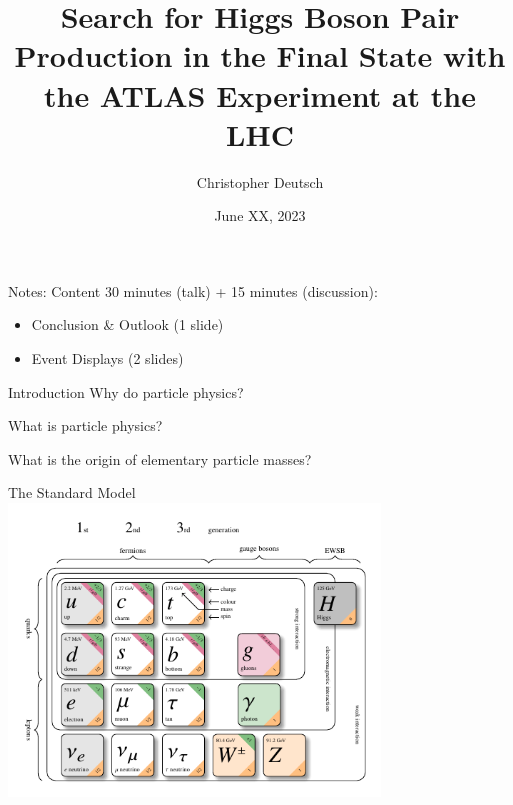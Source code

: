 \documentclass[11pt, xcolor={dvipsnames}, aspectratio=169]{beamer}
\author{Christopher Deutsch}
\institute{University of Bonn}
\date{June XX, 2023}
\title{\vspace{1em}Search for Higgs Boson Pair Production in the \bbtautau Final
  State with the ATLAS Experiment at the LHC}
\begin{document}
\maketitle

\begin{frame}[noframenumbering]{Notes: Content}
  30 minutes (talk) + 15 minutes (discussion):
  \begin{itemize}

  \item Conclusion \& Outlook (1 slide)

  \item Event Displays (2 slides)

  \end{itemize}
\end{frame}


\begin{frame}{Introduction}
  Why do particle physics?

  What is particle physics?

  What is the origin of elementary particle masses?
\end{frame}


\begin{frame}{The Standard Model}
  \includegraphics[width=0.74\textwidth, trim=0cm 0cm 0cm 0.8cm, clip]{theory/sm}




\end{frame}
\end{document}
